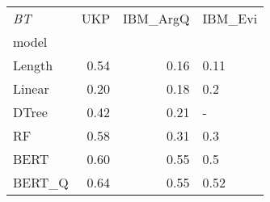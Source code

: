 \begin{tabular}{lrrl}
\toprule
\textit{BT} &   UKP &  IBM\_ArgQ & IBM\_Evi \\
model  &       &           &         \\
\midrule
Length &  0.54 &      0.16 &    0.11 \\
Linear &  0.20 &      0.18 &     0.2 \\
DTree  &  0.42 &      0.21 &       - \\
RF     &  0.58 &      0.31 &     0.3 \\
BERT   &  0.60 &      0.55 &     0.5 \\
BERT\_Q &  0.64 &      0.55 &    0.52 \\
\bottomrule
\end{tabular}
